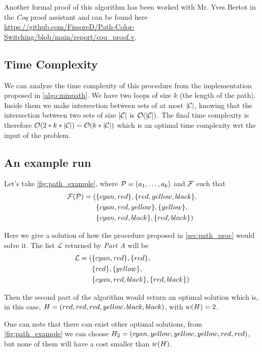 Another formal proof of this algorithm has been worked with Mr. Yves Bertot in the \textit{Coq} proof assistant and can be found here \url{https://github.com/FissoreD/Path-Color-Switching/blob/main/report/coq_proof.v}.

\subsection{Time Complexity}

We can analyze the time complexity of this procedure from the implementation proposed in \cref{algo:minpath}. We have two loops of size $k$ (the length of the path). Inside them we make intersection between sets of at most $| \mathcal{C} |$, knowing that the intersection between two sets of size $| \mathcal{C} |$ is $\mathcal{O}(| \mathcal{C} |)$. The final time complexity is therefore $\mathcal{O}(2 * k * | \mathcal{C} |) = \mathcal{O}(k * | \mathcal{C} |)$ which is an optimal time complexity wrt the input of the problem.

\subsection{An example run}
\label{sec:path_ex_run}



Let's take \cref{fig:path_example}, where $\mathcal{P} = (a_1,\ldots,a_{6})$ and $\mathcal{F}$ such that
\begin{align*}
	\mathcal{F}(\mathcal{P}) = ( & \{cyan,red\}, \{red,yellow,black\},    \\
	                 & \{cyan,red,yellow\}, \{yellow\},    \\
	                 & \{cyan,red,black\}, \{red,black\}   )
\end{align*}

Here we give a solution of how the procedure proposed in \cref{sec:path_proc} would solve it. The list $\mathcal{L}$ returned by \textit{Part A} will be
\begin{align*}
	\mathcal{L} = ( & \{cyan,red\}, \{red\},      \\
	                & \{red\}, \{yellow\},        \\
	                & \{cyan,red,black\}, \{red,black\}   )
\end{align*}

Then the second part of the algorithm would return an optimal solution which is, in this case, $H = (red, red, red, yellow, black, black)$, with $w(H) = 2$.

One can note that there can exist other optimal solutions, from \cref{fig:path_example} we can choose $H_2 = (cyan, yellow, yellow, yellow, red, red)$, but none of them will have a cost smaller than $w(H)$.

